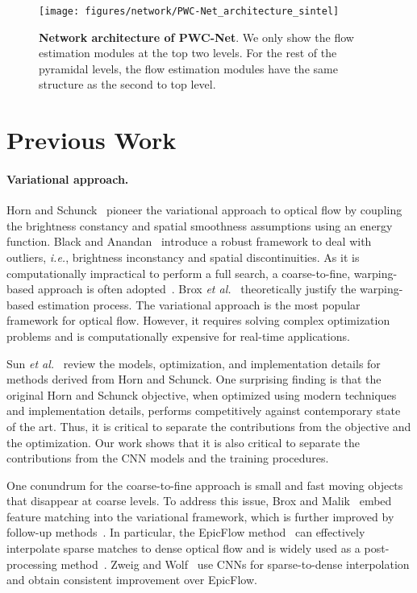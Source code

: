 \documentclass[10pt,journal,cspaper,compsoc]{IEEEtran}
\def\ie{\emph{i.e.}\xspace} \def\Ie{\emph{I.e.}\xspace}
\def\etal{\emph{et al.}\xspace}
\begin{document}
\begin{figure*}[t]
	\begin{center}		
		\newcommand{\shiftfigure}{\hspace{0\linewidth}}
		\texttt{[image: figures/network/PWC-Net\_architecture\_sintel]} 
	\end{center}
	\caption{{\bf Network architecture of PWC-Net}. We only show the flow estimation modules at the top two levels. For the rest of the pyramidal levels, the flow estimation modules have the same structure as the second to top level.}
	\label{fig:network}
\end{figure*}


	
	\section{Previous Work}
	
\paragraph{Variational approach.} 
	Horn and Schunck~\cite{Horn:1981:DO} pioneer the variational approach to optical flow by coupling the brightness constancy and spatial smoothness assumptions using an energy function. Black and Anandan~\cite{Black:1996:REMO} introduce a robust framework to deal with outliers, \ie, brightness inconstancy and spatial discontinuities. As it is computationally impractical to perform a full search, a coarse-to-fine, warping-based approach is often adopted~\cite{Bruhn:2005:CLG}. Brox \etal~\cite{Brox:2004:HAO} theoretically justify the warping-based estimation process.  The variational approach is the most popular framework for optical flow. However, it requires solving complex optimization problems and is computationally expensive for real-time applications. 
	
	Sun \etal~\cite{Sun:IJCV:2014} review the models, optimization, and implementation details for methods derived from Horn and Schunck. One surprising finding is that the original Horn and Schunck objective, when optimized using modern techniques and implementation details, performs competitively against contemporary state of the art. Thus, it is critical to separate the contributions from the objective and the optimization. Our work shows that it is also critical to separate the contributions from the CNN models and the training procedures.
	
	One conundrum for the coarse-to-fine approach is small and fast moving objects that disappear at coarse levels. To address this issue, Brox and Malik~\cite{Brox:LDOF:2011} embed feature matching into the variational framework, which is further improved by follow-up methods~\cite{Weinzaepfel:2013:DeepFlow,Xu:2012:MDP}. In particular, the EpicFlow method~\cite{EpicFlow} can effectively interpolate sparse matches to dense optical flow and is widely used as a post-processing method~\cite{Bai2016Exploiting,Bailer_2017_CVPR,Chen2016Full,Hu2016Efficient,Xu2017Accurate,yang2017s2f}. Zweig and Wolf~\cite{Zweig_2017_CVPR} use CNNs for sparse-to-dense interpolation and obtain consistent improvement over EpicFlow.
	
\end{document}
